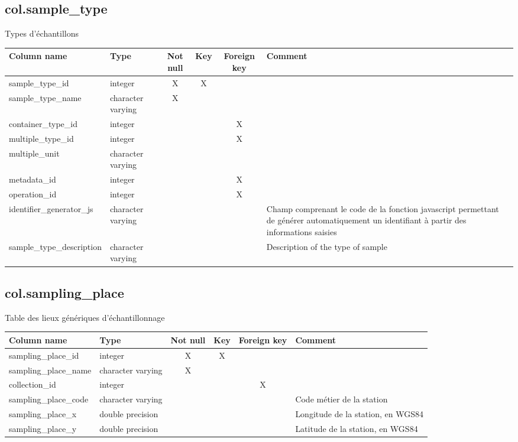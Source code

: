 \subsection{col.sample\_type}
Types d'échantillons

\begin{tabular}{|l| p{2cm}|c|c|c| p{3cm}|}
\hline
Column name & Type & Not null & Key & Foreign key & Comment \\
\hline
sample\_type\_id & integer & X & X & & \\
\hline
sample\_type\_name & character varying & X & & & \\
\hline
container\_type\_id & integer & & & X & \\
\hline
multiple\_type\_id & integer & & & X & \\
\hline
multiple\_unit & character varying & & & & \\
\hline
metadata\_id & integer & & & X & \\
\hline
operation\_id & integer & & & X & \\
\hline
identifier\_generator\_js & character varying & & & & Champ comprenant le code de la fonction javascript permettant de générer automatiquement un identifiant à partir des informations saisies\\
\hline
sample\_type\_description & character varying & & & & Description of the type of sample\\
\hline
\end{tabular}
\subsection{col.sampling\_place}
Table des lieux génériques d'échantillonnage

\begin{tabular}{|l| p{2cm}|c|c|c| p{3cm}|}
\hline
Column name & Type & Not null & Key & Foreign key & Comment \\
\hline
sampling\_place\_id & integer & X & X & & \\
\hline
sampling\_place\_name & character varying & X & & & \\
\hline
collection\_id & integer & & & X & \\
\hline
sampling\_place\_code & character varying & & & & Code métier de la station\\
\hline
sampling\_place\_x & double precision & & & & Longitude de la station, en WGS84\\
\hline
sampling\_place\_y & double precision & & & & Latitude de la station, en WGS84\\
\hline
\end{tabular}

